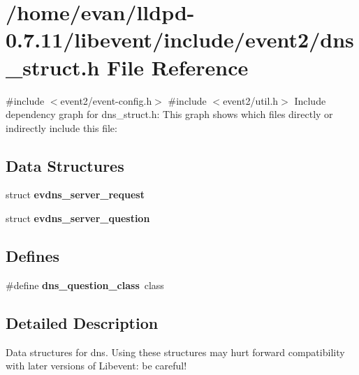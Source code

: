 \section{/home/evan/lldpd-\/0.7.11/libevent/include/event2/dns\-\_\-struct.h \-File \-Reference}
\label{dns__struct_8h}
{\ttfamily \#include $<$event2/event-\/config.\-h$>$}\*
{\ttfamily \#include $<$event2/util.\-h$>$}\*
\-Include dependency graph for dns\-\_\-struct.\-h\-:
\-This graph shows which files directly or indirectly include this file\-:
\subsection*{\-Data \-Structures}
\begin{DoxyCompactItemize}
\item 
struct {\bf evdns\-\_\-server\-\_\-request}
\item 
struct {\bf evdns\-\_\-server\-\_\-question}
\end{DoxyCompactItemize}
\subsection*{\-Defines}
\begin{DoxyCompactItemize}
\item 
\#define {\bfseries dns\-\_\-question\-\_\-class}~class\label{dns__struct_8h_a87467ffcdae1709b510732b6218a299b}

\end{DoxyCompactItemize}


\subsection{\-Detailed \-Description}
\-Data structures for dns. \-Using these structures may hurt forward compatibility with later versions of \-Libevent\-: be careful! 